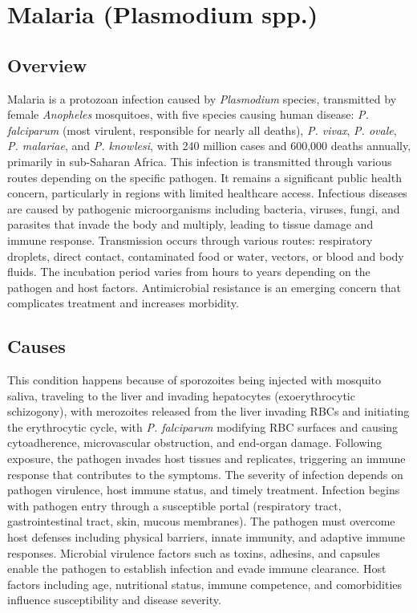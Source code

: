 \chapter{Malaria (Plasmodium spp.)}
\label{sec:Malaria}

\section{Overview}
Malaria is a protozoan infection caused by \textit{Plasmodium} species, transmitted by female \textit{Anopheles} mosquitoes, with five species causing human disease: \textit{P. falciparum} (most virulent, responsible for nearly all deaths), \textit{P. vivax}, \textit{P. ovale}, \textit{P. malariae}, and \textit{P. knowlesi}, with 240 million cases and 600,000 deaths annually, primarily in sub-Saharan Africa. This infection is transmitted through various routes depending on the specific pathogen. It remains a significant public health concern, particularly in regions with limited healthcare access. Infectious diseases are caused by pathogenic microorganisms including bacteria, viruses, fungi, and parasites that invade the body and multiply, leading to tissue damage and immune response. Transmission occurs through various routes: respiratory droplets, direct contact, contaminated food or water, vectors, or blood and body fluids. The incubation period varies from hours to years depending on the pathogen and host factors. Antimicrobial resistance is an emerging concern that complicates treatment and increases morbidity.
\section{Causes}
This condition happens because of sporozoites being injected with mosquito saliva, traveling to the liver and invading hepatocytes (exoerythrocytic schizogony), with merozoites released from the liver invading RBCs and initiating the erythrocytic cycle, with \textit{P. falciparum} modifying RBC surfaces and causing cytoadherence, microvascular obstruction, and end-organ damage. Following exposure, the pathogen invades host tissues and replicates, triggering an immune response that contributes to the symptoms. The severity of infection depends on pathogen virulence, host immune status, and timely treatment. Infection begins with pathogen entry through a susceptible portal (respiratory tract, gastrointestinal tract, skin, mucous membranes). The pathogen must overcome host defenses including physical barriers, innate immunity, and adaptive immune responses. Microbial virulence factors such as toxins, adhesins, and capsules enable the pathogen to establish infection and evade immune clearance. Host factors including age, nutritional status, immune competence, and comorbidities influence susceptibility and disease severity.
